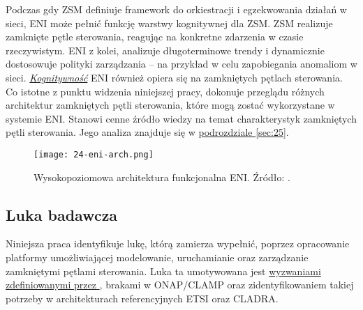 Podczas gdy ZSM definiuje framework do orkiestracji i egzekwowania działań w sieci, ENI może pełnić funkcję warstwy kognitywnej dla ZSM. ZSM realizuje zamknięte pętle sterowania, reagując na konkretne zdarzenia w czasie rzeczywistym. ENI z kolei, analizuje długoterminowe trendy i dynamicznie dostosowuje polityki zarządzania – na przykład w celu zapobiegania anomaliom w sieci. \hyperlink{def:kognitywnosc}{\textit{Kognitywność}} ENI również opiera się na zamkniętych pętlach sterowania. Co istotne z punktu widzenia niniejszej pracy, \cite{etsieni2024} dokonuje przeglądu różnych architektur zamkniętych pętli sterowania, które mogą zostać wykorzystane w systemie ENI. Stanowi cenne źródło wiedzy na temat charakterystyk zamkniętych pętli sterowania. Jego analiza znajduje się w \hyperlink{sec:25}{podrozdziale \ref{sec:25}}.



\begin{figure}[!htbp]
    \centering \texttt{[image: 24-eni-arch.png]}
    \caption{Wysokopoziomowa architektura funkcjonalna ENI. Źródło: \cite{etsieni2023}.}\label{fig:24-eni-arch}
\end{figure}


\subsection{Luka badawcza}

Niniejsza praca identyfikuje lukę, którą zamierza wypełnić, poprzez opracowanie platformy umożliwiającej modelowanie, uruchamianie oraz zarządzanie zamkniętymi pętlami sterowania. Luka ta umotywowana jest \hyperlink{list:1}{wyzwaniami zdefiniowanymi przez \cite{fallon2019}}, brakami w ONAP/CLAMP oraz zidentyfikowaniem takiej potrzeby w architekturach referencyjnych ETSI oraz CLADRA.
